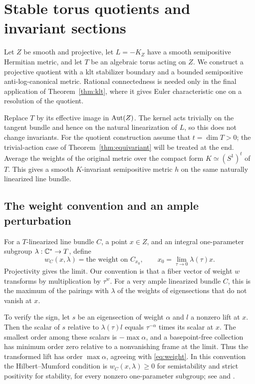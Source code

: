 \section{Stable torus quotients and invariant sections}\label{sec:quotient}

Let $Z$ be smooth and projective, let $L=-K_Z$ have a smooth semipositive Hermitian metric, and let $T$ be an algebraic torus acting on $Z$. We construct a projective quotient with a klt stabilizer boundary and a bounded semipositive anti-log-canonical metric. Rational connectedness is needed only in the final application of Theorem~\ref{thm:klt}, where it gives Euler characteristic one on a resolution of the quotient.

Replace $T$ by its effective image in $\operatorname{Aut}(Z)$. The kernel acts trivially on the tangent bundle and hence on the natural linearization of $L$, so this does not change invariants. For the quotient construction assume that $t=\dim T>0$; the trivial-action case of Theorem~\ref{thm:equivariant} will be treated at the end. Average the weights of the original metric over the compact form $K\simeq(S^1)^t$ of $T$. This gives a smooth $K$-invariant semipositive metric $h$ on the same naturally linearized line bundle.

\subsection{The weight convention and an ample perturbation}\label{subsec:weights}

For a $T$-linearized line bundle $C$, a point $x\in Z$, and an integral one-parameter subgroup $\lambda:\mathbb C^*\to T$, define
\begin{equation}\label{eq:weight}
w_C(x,\lambda)=\text{the weight on }C_{x_0},
\qquad x_0=\lim_{\tau\to0}\lambda(\tau)x.
\end{equation}
Projectivity gives the limit. Our convention is that a fiber vector of weight $w$ transforms by multiplication by $\tau^w$. For a very ample linearized bundle $C$, this is the maximum of the pairings with $\lambda$ of the weights of eigensections that do not vanish at $x$.

To verify the sign, let $s$ be an eigensection of weight $\alpha$ and $l$ a nonzero lift at $x$. Then the scalar of $s$ relative to $\lambda(\tau)l$ equals $\tau^{-\alpha}$ times its scalar at $x$. The smallest order among these scalars is $-\max\alpha$, and a basepoint-free collection has minimum order zero relative to a nonvanishing frame at the limit. Thus the transformed lift has order $\max\alpha$, agreeing with \eqref{eq:weight}. In this convention the Hilbert--Mumford condition is $w_C(x,\lambda)\ge0$ for semistability and strict positivity for stability, for every nonzero one-parameter subgroup; see \cite{MFK1994} and \cite[\S1.1.5]{DolgachevHu1998}.

